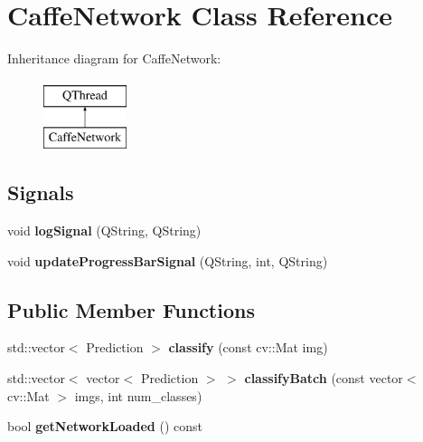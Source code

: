 \hypertarget{class_caffe_network}{}\section{Caffe\+Network Class Reference}
\label{class_caffe_network}
Inheritance diagram for Caffe\+Network\+:\begin{figure}[H]
\begin{center}
\leavevmode
\includegraphics[height=2.000000cm]{class_caffe_network}
\end{center}
\end{figure}
\subsection*{Signals}
\begin{DoxyCompactItemize}
\item 
\mbox{\label{class_caffe_network_aac47d29693e37b199fb0d753bbfa3765}} 
void {\bfseries log\+Signal} (Q\+String, Q\+String)
\item 
\mbox{\label{class_caffe_network_a2da0df987eb997f30e689c27690f42ee}} 
void {\bfseries update\+Progress\+Bar\+Signal} (Q\+String, int, Q\+String)
\end{DoxyCompactItemize}
\subsection*{Public Member Functions}
\begin{DoxyCompactItemize}
\item 
\mbox{\label{class_caffe_network_ad4072a7e00f5005800d0047dfff0d5d2}} 
std\+::vector$<$ Prediction $>$ {\bfseries classify} (const cv\+::\+Mat img)
\item 
\mbox{\label{class_caffe_network_a09117db8276880b57a6595d5f3b15fed}} 
std\+::vector$<$ vector$<$ Prediction $>$ $>$ {\bfseries classify\+Batch} (const vector$<$ cv\+::\+Mat $>$ imgs, int num\+\_\+classes)
\item 
\mbox{\label{class_caffe_network_a31876d345c48c7d8a764623f0f025a3f}} 
bool {\bfseries get\+Network\+Loaded} () const
\end{DoxyCompactItemize}


